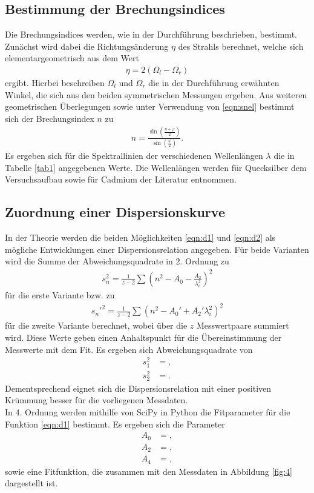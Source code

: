 \subsection{Bestimmung der Brechungsindices}
Die Brechungsindices werden, wie in der Durchführung beschrieben, bestimmt.
Zunächst wird dabei die Richtungsänderung $\eta$ des Strahls berechnet, welche sich elementargeometrisch aus dem Wert
\begin{align}
  \eta = 2 (\Omega_l - \Omega_r)
\end{align}
ergibt.
Hierbei beschreiben $\Omega_l$ und $\Omega_r$ die in der Durchführung erwähnten Winkel, die sich aus den beiden symmetrischen Messungen ergeben.
Aus weiteren geometrischen Überlegungen sowie unter Verwendung von \eqref{eqn:snel} bestimmt sich der Brechungsindex $n$ zu
\begin{align}
  n = \frac{\sin{(\frac{\eta + \varphi}{2})}}{\sin{(\frac{\varphi}{2})}}.
\end{align}
Es ergeben sich für die Spektrallinien der verschiedenen Wellenlängen $\lambda$ die in Tabelle \ref{tab1} angegebenen Werte.
Die Wellenlängen werden für Quecksilber dem Versuchsaufbau sowie für Cadmium der Literatur \cite{cd} entnommen.
    

\subsection{Zuordnung einer Dispersionskurve}
In der Theorie werden die beiden Möglichkeiten \eqref{eqn:d1} und \eqref{eqn:d2} als mögliche Entwicklungen einer Dispersionsrelation angegeben.
Für beide Varianten wird die Summe der Abweichungsquadrate in 2. Ordnung zu
\begin{align*}
  s_n^2 = \frac{1}{z-2} \sum ( n^2 - A_0 - \frac{A_2}{\lambda_i^2} )^2
\end{align*}
für die erste Variante bzw. zu
\begin{align*}
  s_n'^2 = \frac{1}{z-2} \sum ( n^2 - A_0' + A_2' \lambda_i^2 )^2
\end{align*}
für die zweite Variante berechnet, wobei über die $z$ Messwertpaare summiert wird.
Diese Werte geben einen Anhaltspunkt für die Übereinstimmung der Messwerte mit dem Fit.
Es ergeben sich Abweichungsquadrate von
\begin{align*}
  s_1^2 &= ,\\
  s_2^2 &= .
\end{align*}
Dementsprechend eignet sich die Dispersionsrelation mit einer positiven Krümmung besser für die vorliegenen Messdaten.\\
In 4. Ordnung werden mithilfe von SciPy in Python die Fitparameter für die Funktion \eqref{eqn:d1} bestimmt.
Es ergeben sich die Parameter
\begin{align*}
A_0 &= ,\\
A_2 &= ,\\
A_4 &= ,
\end{align*}
sowie eine Fitfunktion, die zusammen mit den Messdaten in Abbildung \ref{fig:4} dargestellt ist.

